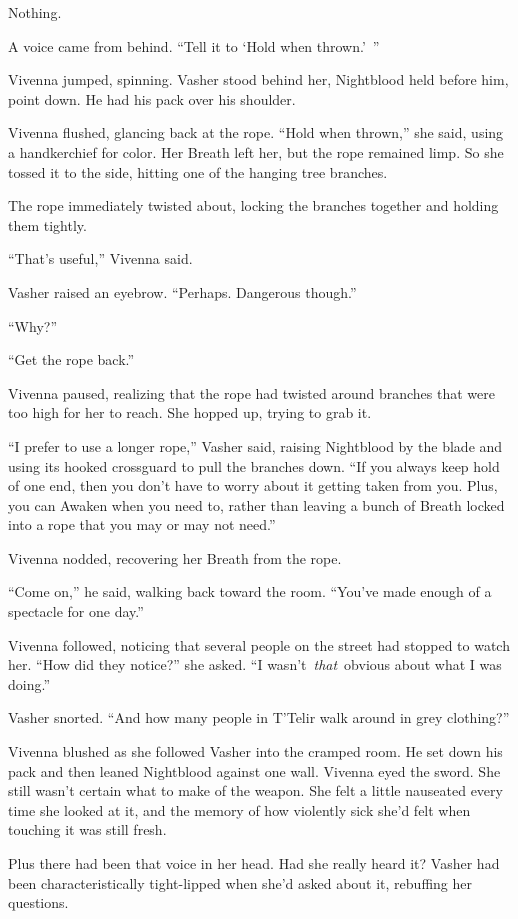 Nothing.

A voice came from behind. “Tell it to ‘Hold when thrown.’~”

Vivenna jumped, spinning. Vasher stood behind her, Nightblood held before him, point down. He had his pack over his shoulder.

Vivenna flushed, glancing back at the rope. “Hold when thrown,” she said, using a handkerchief for color. Her Breath left her, but the rope remained limp. So she tossed it to the side, hitting one of the hanging tree branches.

The rope immediately twisted about, locking the branches together and holding them tightly.

“That’s useful,” Vivenna said.

Vasher raised an eyebrow. “Perhaps. Dangerous though.”

“Why?”

“Get the rope back.”

Vivenna paused, realizing that the rope had twisted around branches that were too high for her to reach. She hopped up, trying to grab it.

“I prefer to use a longer rope,” Vasher said, raising Nightblood by the blade and using its hooked crossguard to pull the branches down. “If you always keep hold of one end, then you don’t have to worry about it getting taken from you. Plus, you can Awaken when you need to, rather than leaving a bunch of Breath locked into a rope that you may or may not need.”

Vivenna nodded, recovering her Breath from the rope.

“Come on,” he said, walking back toward the room. “You’ve made enough of a spectacle for one day.”

Vivenna followed, noticing that several people on the street had stopped to watch her. “How did they notice?” she asked. “I wasn’t~\textit{that}~obvious about what I was doing.”

Vasher snorted. “And how many people in T’Telir walk around in grey clothing?”

Vivenna blushed as she followed Vasher into the cramped room. He set down his pack and then leaned Nightblood against one wall. Vivenna eyed the sword. She still wasn’t certain what to make of the weapon. She felt a little nauseated every time she looked at it, and the memory of how violently sick she’d felt when touching it was still fresh.

Plus there had been that voice in her head. Had she really heard it? Vasher had been characteristically tight-lipped when she’d asked about it, rebuffing her questions.

